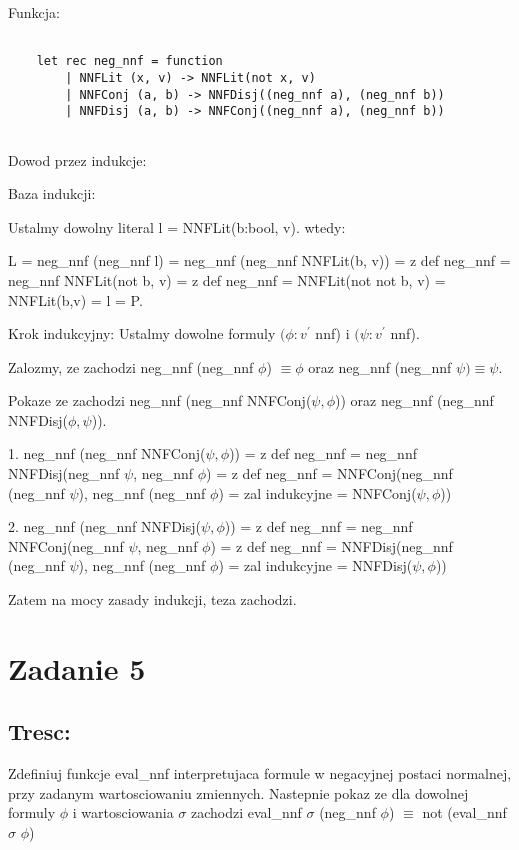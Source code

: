 \documentclass{article}
\begin{document}
Funkcja:

\begin{lstlisting}

    let rec neg_nnf = function
        | NNFLit (x, v) -> NNFLit(not x, v)
        | NNFConj (a, b) -> NNFDisj((neg_nnf a), (neg_nnf b))
        | NNFDisj (a, b) -> NNFConj((neg_nnf a), (neg_nnf b)) 
    
\end{lstlisting}

Dowod przez indukcje:

Baza indukcji:

Ustalmy dowolny literal l = NNFLit(b:bool, v). wtedy:

L = neg\_nnf (neg\_nnf l) = neg\_nnf (neg\_nnf NNFLit(b, v)) = z def neg\_nnf = neg\_nnf NNFLit(not b, v) = z def neg\_nnf = NNFLit(not not b, v) = NNFLit(b,v) = l = P.

Krok indukcyjny: Ustalmy dowolne formuly $(\phi : v^{\prime}$ nnf) i  $(\psi : v^{\prime}$ nnf).

Zalozmy, ze zachodzi neg\_nnf (neg\_nnf $\phi$) $\equiv \phi$ oraz neg\_nnf (neg\_nnf $\psi) \equiv \psi$. 


Pokaze ze zachodzi neg\_nnf (neg\_nnf NNFConj($\psi, \phi$)) oraz neg\_nnf (neg\_nnf NNFDisj($\phi, \psi$)).

1. neg\_nnf (neg\_nnf NNFConj($\psi, \phi$)) = z def neg\_nnf = neg\_nnf NNFDisj(neg\_nnf $\psi$, neg\_nnf $\phi$) = z def neg\_nnf = NNFConj(neg\_nnf (neg\_nnf $\psi$), neg\_nnf (neg\_nnf $\phi$) = zal indukcyjne = NNFConj($\psi, \phi$)) 

2.  neg\_nnf (neg\_nnf NNFDisj($\psi, \phi$)) = z def neg\_nnf = neg\_nnf NNFConj(neg\_nnf $\psi$, neg\_nnf $\phi$) = z def neg\_nnf = NNFDisj(neg\_nnf (neg\_nnf $\psi$), neg\_nnf (neg\_nnf $\phi$) = zal indukcyjne = NNFDisj($\psi, \phi$)) 

Zatem na mocy zasady indukcji, teza zachodzi. 

\section{Zadanie 5}

\subsection{Tresc:}

Zdefiniuj funkcje eval\_nnf interpretujaca formule w negacyjnej postaci normalnej, przy zadanym wartosciowaniu zmiennych. Nastepnie pokaz ze dla dowolnej formuly $\phi$ i wartosciowania $\sigma$ zachodzi eval\_nnf $\sigma$ (neg\_nnf $\phi$) $\equiv$ not (eval\_nnf $\sigma$ $\phi$)
\end{document}
